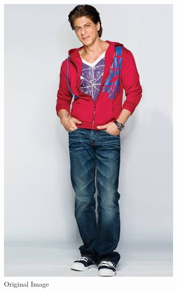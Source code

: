 \begin{figure}[H]
    \centering
    \begin{subfigure}[b]{0.3\textwidth}
        \includegraphics[width=\textwidth]{images/og_image.png}
        \caption{Original Image}
    \end{subfigure}
    \begin{subfigure}[b]{0.3\textwidth}

\end{subfigure}
\end{figure}

